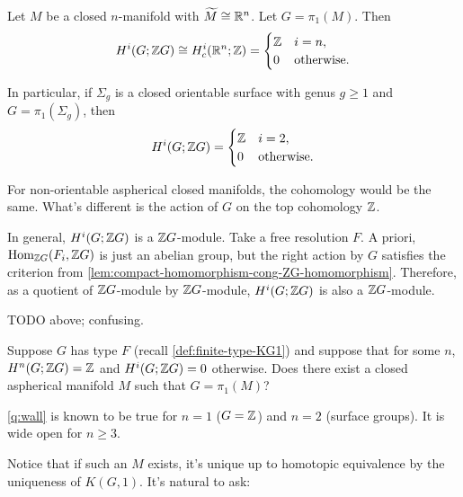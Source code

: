 \begin{corollary}
    \label{cor:cohomology-of-surface-group}
    Let \(M\) be a closed \(n\)-manifold with \(\tilde M \cong \R^n\). Let \(G=\pi_1(M)\). Then 
    \begin{align*}
        H^i(G;\Z G) \cong H^i_c(\R^n;\Z) = \begin{cases}
            \Z & i=n,\\
            0 & \text{otherwise}.
        \end{cases}
    \end{align*}

    In particular, if \(\Sigma_g\) is a closed orientable surface with genus \(g \geq 1\) and \(G=\pi_1(\Sigma_g)\), then 
    \begin{align*}
        H^i(G;\Z G) = \begin{cases}
            \Z & i=2,\\
            0 & \text{otherwise}.
        \end{cases}
    \end{align*}
\end{corollary}
\begin{remark}
    For non-orientable aspherical closed manifolds, the cohomology would be the same. What's different is the action of \(G\) on the top cohomology \(\Z\).
\end{remark}

In general, \(H^i(G;\Z G)\) is a \(\Z G\)-module. Take a free resolution \(F\). A priori, \(\Hom{F_i }{\Z G }{\Z G}\) is just an abelian group, but the right action by \(G\) satisfies  the criterion from \cref{lem:compact-homomorphism-cong-ZG-homomorphism}. Therefore, as a quotient of \(\Z G\)-module by \(\Z G\)-module, \(H^i(G;\Z G)\) is also a \(\Z G\)-module.

TODO above; confusing.


\begin{question}[Wall]
    \label{q:wall}
    Suppose \(G\) has type \(F\) (recall \cref{def:finite-type-KG1}) and suppose that for some \(n\), \(H^n(G;\Z G) = \Z\) and \(H^i(G; \Z G) =0\) otherwise. Does there exist a closed aspherical manifold \(M\) such that \(G=\pi_1 (M)\)?
\end{question}

\cref{q:wall} is known to be true for \(n= 1\) (\(G =\Z\))  and \(n=2\) (surface groups). It is wide open for \(n\geq 3\). 

Notice that if such an \(M\) exists, it's unique up to homotopic equivalence by the uniqueness of \(K(G,1)\). It's natural to ask:

